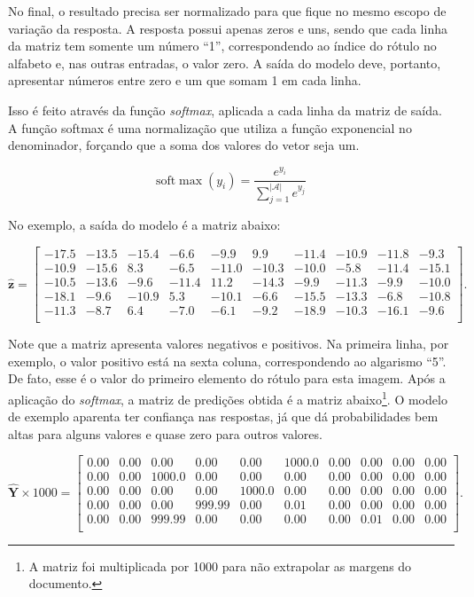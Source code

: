 \documentclass[12pt,twoside,brazilian]{book}
\begin{document}
No final, o resultado precisa ser normalizado para que fique no mesmo
escopo de variação da resposta. A resposta possui apenas zeros e uns,
sendo que cada linha da matriz tem somente um número ``1'',
correspondendo ao índice do rótulo no alfabeto e, nas outras entradas, o
valor zero. A saída do modelo deve, portanto, apresentar números entre
zero e um que somam 1 em cada linha.

Isso é feito através da função \emph{softmax}, aplicada a cada linha da
matriz de saída. A função softmax é uma normalização que utiliza a
função exponencial no denominador, forçando que a soma dos valores do
vetor seja um.

\[
\text{soft}\max(y_i) = \frac{e^{y_i}}{\sum_{j=1}^{|\mathcal A|} e^{y_j}}
\]

No exemplo, a saída do modelo é a matriz abaixo:

\[
\hat{\mathbf z} = \left[\begin{array}{rrrrrrrrrr}
  -17.5 & -13.5 & -15.4 & -6.6 & -9.9 & 9.9 & -11.4 & -10.9 & -11.8 & -9.3 \\ 
  -10.9 & -15.6 & 8.3 & -6.5 & -11.0 & -10.3 & -10.0 & -5.8 & -11.4 & -15.1 \\ 
  -10.5 & -13.6 & -9.6 & -11.4 & 11.2 & -14.3 & -9.9 & -11.3 & -9.9 & -10.0 \\ 
  -18.1 & -9.6 & -10.9 & 5.3 & -10.1 & -6.6 & -15.5 & -13.3 & -6.8 & -10.8 \\ 
  -11.3 & -8.7 & 6.4 & -7.0 & -6.1 & -9.2 & -18.9 & -10.3 & -16.1 & -9.6 \\ 
\end{array}\right].
\]

Note que a matriz apresenta valores negativos e positivos. Na primeira
linha, por exemplo, o valor positivo está na sexta coluna,
correspondendo ao algarismo ``5''. De fato, esse é o valor do primeiro
elemento do rótulo para esta imagem. Após a aplicação do \emph{softmax},
a matriz de predições obtida é a matriz abaixo\footnote{A matriz foi
  multiplicada por 1000 para não extrapolar as margens do documento.}. O
modelo de exemplo aparenta ter confiança nas respostas, já que dá
probabilidades bem altas para alguns valores e quase zero para outros
valores.

\[
\hat{\mathbf Y}\times 1000 = \left[\begin{array}{rrrrrrrrrr}
  0.00 & 0.00 & 0.00 & 0.00 & 0.00 & 1000.0 & 0.00 & 0.00 & 0.00 & 0.00 \\ 
  0.00 & 0.00 & 1000.0 & 0.00 & 0.00 & 0.00 & 0.00 & 0.00 & 0.00 & 0.00 \\ 
  0.00 & 0.00 & 0.00 & 0.00 & 1000.0 & 0.00 & 0.00 & 0.00 & 0.00 & 0.00 \\ 
  0.00 & 0.00 & 0.00 & 999.99 & 0.00 & 0.01 & 0.00 & 0.00 & 0.00 & 0.00 \\ 
  0.00 & 0.00 & 999.99 & 0.00 & 0.00 & 0.00 & 0.00 & 0.01 & 0.00 & 0.00 \\
\end{array}\right].
\]
\end{document}
